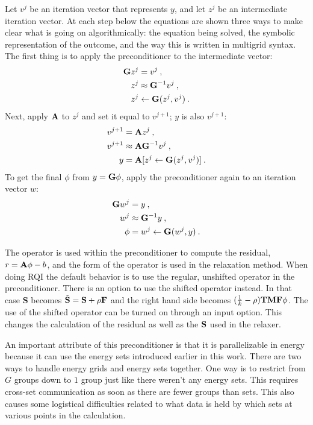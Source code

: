 Let $v^{j}$ be an iteration vector that represents $y$, and let $z^{j}$ be an intermediate iteration vector. At each step below the equations are shown three ways to make clear what is going on algorithmically: the equation being solved, the symbolic representation of the outcome, and the way this is written in multigrid syntax. The first thing is to apply the preconditioner to the intermediate vector: %
%
\begin{align}
  \mathbf{G}z^{j} &= v^{j} \:,  \label{eq:invertG} \\
  z^{j} &\approx \mathbf{G}^{-1}v^{j} \:, \nonumber \\
  z^{j} &\leftarrow \mathbf{G}(z^{j}, v^{j}) \:. \nonumber
\end{align}
%
Next, apply $\mathbf{A}$ to $z^{j}$ and set it equal to $v^{j+1}$; $y$ is also $v^{j+1}$:
\begin{align}
  v^{j+1} &= \mathbf{A}z^{j} \:,   \label{eq:ApplyA} \\
  v^{j+1} &\approx \mathbf{AG}^{-1}v^{j} \:, \nonumber \\
  y &= \mathbf{A}[z^{j} \leftarrow \mathbf{G}(z^{j}, v^{j})] \:. \nonumber
\end{align}
%
To get the final $\phi$ from $y = \mathbf{G}\phi$, apply the preconditioner again to an iteration vector $w$:
%
\begin{align}
  \mathbf{G}w^{j} &= y \:,   \label{eq:findPhi} \\
  w^{j} &\approx \mathbf{G}^{-1}y \:, \nonumber \\
  \phi &= w^{j} \leftarrow \mathbf{G}(w^{j}, y) \:. \nonumber
\end{align}

The operator is used within the preconditioner to compute the residual, $r = \mathbf{A}\phi - b$, and the form of the operator is used in the relaxation method. When doing RQI the default behavior is to use the regular, unshifted operator in the preconditioner. There is an option to use the shifted operator instead. In that case $\mathbf{S}$ becomes $\tilde{\mathbf{S}} = \mathbf{S} + \rho\mathbf{F}$ and the right hand side becomes $(\frac{1}{k} - \rho)\mathbf{TMF}\phi$. The use of the shifted operator can be turned on through an input option. This changes the calculation of the residual as well as the $\mathbf{S}$ used in the relaxer.

An important attribute of this preconditioner is that it is parallelizable in energy because it can use the energy sets introduced earlier in this work. There are two ways to handle energy grids and energy sets together. One way is to restrict from $G$ groups down to $1$ group just like there weren't any energy sets. This requires cross-set communication as soon as there are fewer groups than sets. This also causes some logistical difficulties related to what data is held by which sets at various points in the calculation. 

